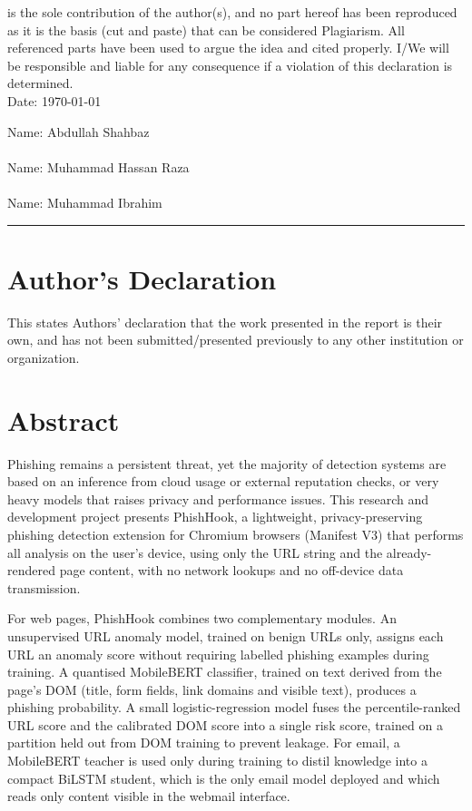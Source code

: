 \documentclass{FastFyp}
\begin{document}
is the sole contribution of the author(s), and no part hereof has been reproduced as it is the basis (cut and paste) that can be considered Plagiarism. All referenced parts have been used to argue the idea and cited properly. I/We will be responsible and liable for any consequence if a violation of this declaration is determined.
\\[4ex]
Date: \today

\begin{flushright}
Name: Abdullah Shahbaz
\\[1ex]
\\[5ex]
Name: Muhammad Hassan Raza
\\[1ex]
\\[5ex]
Name: Muhammad Ibrahim
\\[1ex]
\end{flushright}
\vspace{1 cm}
\hrule
\vspace{0.5 cm}

\section*{Author's Declaration}
This states Authors' declaration that the work presented in the report is their own, and has not been submitted/presented previously to any other institution or organization.
\pagebreak

\section*{Abstract}
Phishing remains a persistent threat, yet the majority of detection systems are based on an inference from cloud usage or external reputation checks, or very heavy models that raises privacy and performance issues. This research and development project presents PhishHook, a lightweight, privacy-preserving phishing detection extension for Chromium browsers (Manifest V3) that performs all analysis on the user's device, using only the URL string and the already-rendered page content, with no network lookups and no off-device data transmission.

For web pages, PhishHook combines two complementary modules. An unsupervised URL anomaly model, trained on benign URLs only, assigns each URL an anomaly score without requiring labelled phishing examples during training. A quantised MobileBERT classifier, trained on text derived from the page's DOM (title, form fields, link domains and visible text), produces a phishing probability. A small logistic-regression model fuses the percentile-ranked URL score and the calibrated DOM score into a single risk score, trained on a partition held out from DOM training to prevent leakage. For email, a MobileBERT teacher is used only during training to distil knowledge into a compact BiLSTM student, which is the only email model deployed and which reads only content visible in the webmail interface.
\end{document}
